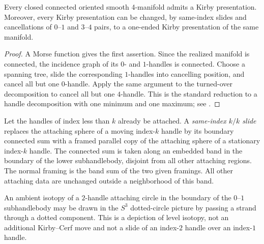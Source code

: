 \begin{proposition}
\label{prop:kirby-presentation-existence}
Every closed connected oriented smooth 4-manifold admits a Kirby
presentation.  Moreover, every Kirby presentation can be changed, by
same-index slides and cancellations of \(0\)--\(1\) and \(3\)--\(4\) pairs,
to a one-ended Kirby presentation of the same manifold.
\end{proposition}

\begin{proof}
A Morse function gives the first assertion.  Since the realized manifold is
connected, the incidence graph of its \(0\)- and \(1\)-handles is connected.
Choose a spanning tree, slide the corresponding \(1\)-handles into cancelling
position, and cancel all but one \(0\)-handle.  Apply the same argument to the
turned-over decomposition to cancel all but one \(4\)-handle.  This is the
standard reduction to a handle decomposition with one minimum and one maximum;
see \cite[Sections~4.2 and~5.1]{GompfStipsicz1999}.
\end{proof}

\begin{definition}
\label{def:handle-slide}
Let the handles of index less than \(k\) already be attached.
A \emph{same-index \(k/k\) slide} replaces the attaching sphere of a moving
index-\(k\) handle by its boundary connected sum with a framed parallel copy
of the attaching sphere of a stationary index-\(k\) handle.  The connected
sum is taken along an embedded band in the boundary of the lower
subhandlebody, disjoint from all other attaching regions.  The normal
framing is the band sum of the two given framings.  All other attaching data
are unchanged outside a neighborhood of this band.

\end{definition}

\begin{remark}
An ambient isotopy of a \(2\)-handle attaching circle in the boundary of the
\(0\)--\(1\) subhandlebody may be drawn in the \(S^3\) dotted-circle picture
by passing a strand through a dotted component.  This is a depiction of level
isotopy, not an additional Kirby--Cerf move and not a slide of an index-\(2\)
handle over an index-\(1\) handle.
\end{remark}

